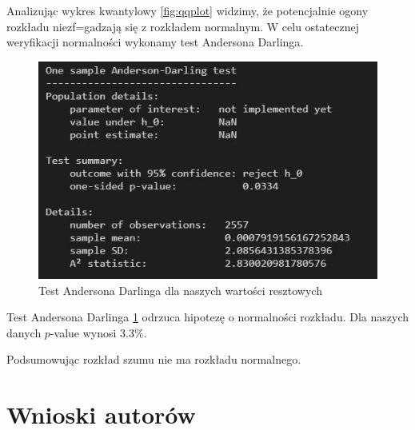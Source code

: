 \documentclass[12pt]{article}
\theoremstyle{exer}
\begin{document}
Analizując wykres kwantylowy \ref{fig:qqplot} widzimy, że potencjalnie ogony rozkładu niezf=gadzają się z rozkładem normalnym. W celu ostatecznej weryfikacji normalności wykonamy test Andersona Darlinga. 
\begin{figure}[H]
	\centering
	\includegraphics[width=3\columnwidth/4]{img/ad_test.png}
	\caption{Test Andersona Darlinga dla naszych wartości resztowych}
	\label{Test_AD}
\end{figure}
Test Andersona Darlinga \ref{Test_AD} odrzuca hipotezę o normalności rozkładu. Dla naszych danych $p$-value wynosi $3.3\%$. 

Podsumowując rozkład szumu nie ma rozkładu normalnego.
	\section{Wnioski autorów}
	
	
\end{document}
